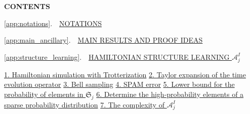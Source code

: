 \documentclass[twocolumn,superscriptaddress,aps,showpacs,amsmath,amstex,amssymb,citeautoscript,floatfix,pra,preprintnumbers]{revtex4-2}
\theoremstyle{plain}
\theoremstyle{plain}
\theoremstyle{plain}
\theoremstyle{plain}
\theoremstyle{plain}
\theoremstyle{plain}
\begin{document}
\begin{appendix}
\clearpage 


\renewcommand{\appendixname}{Appendix}
\newcommand{\appendixarabic}{
    \renewcommand{\thesubsection}{\arabic{subsection}}
    \renewcommand{\thesubsubsection}{\arabic{subsection}.\arabic{subsubsection}}
    \makeatletter
    \renewcommand{\p@subsection}{}
    \renewcommand{\p@subsubsection}{}
    \makeatother
}

\renewcommand{\figurename}{Supplementary Figure}
\setcounter{secnumdepth}{3}
\makeatletter
\makeatother


\setcounter{figure}{0}
\renewcommand{\figurename}{Fig.}
\renewcommand{\thefigure}{S\arabic{figure}}
\setcounter{table}{0}
\renewcommand{\tablename}{Table}
\renewcommand{\thetable}{S\arabic{table}}

\begin{center}
    \textbf{CONTENTS}
\end{center}

\smallskip

\noindent \ref{app:notations}.~~\hyperref[app:notations]{NOTATIONS}\dotfill\textbf{\pageref{app:notations}}
\medskip

\noindent \ref{app:main_ancillary}.~~\hyperref[app:main_ancillary]{MAIN RESULTS AND PROOF IDEAS}\dotfill\textbf{\pageref{app:main_ancillary}}
\medskip



\noindent 
\ref{app:structure_learning}.~~\hyperref[app:structure_learning]{HAMILTONIAN STRUCTURE LEARNING $\mathcal{A}^{I}_j$} \dotfill\textbf{\pageref{app:structure_learning}}
\medskip

\noindent \qquad \begin{minipage}{\dimexpr\textwidth-0.82cm}
  \hyperref[app:Trotter]{1. Hamiltonian simulation with Trotterization}\dotfill\textbf{\pageref{app:Trotter}}
  \newline
\hyperref[app:Taylor]{2. Taylor expansion of the time evolution operator}\dotfill\textbf{\pageref{app:Taylor}}
\newline
\hyperref[sec:Bell_sampling]{3. Bell sampling}\dotfill\textbf{\pageref{sec:Bell_sampling}}
\newline
\hyperref[sec:SPAM_error]{4. SPAM error}\dotfill\textbf{\pageref{sec:SPAM_error}}
\newline
\hyperref[sec:lower_bound_prob]{5. Lower bound for the probability of elements in $\mathfrak{S}_j$}\dotfill\textbf{\pageref{sec:lower_bound_prob}}
\newline
\hyperref[sec:high_prob_detection]{6. Determine the high-probability elements of a sparse probability distribution}\dotfill\textbf{\pageref{sec:high_prob_detection}}
\newline
\hyperref[sec:complexity_I]{7. The complexity of $\mathcal{A}_j^{I}$}\dotfill\textbf{\pageref{sec:complexity_I}}
 \end{minipage}
\medskip


\end{appendix}
\end{document}
